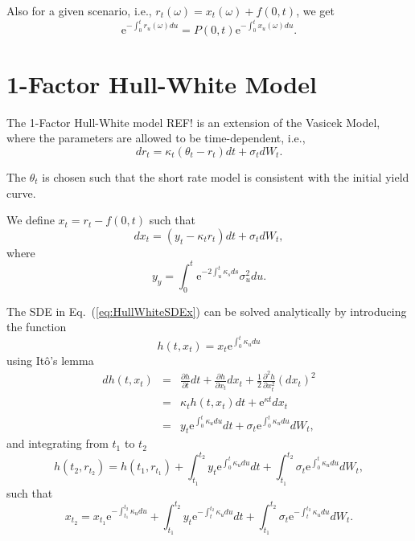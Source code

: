\documentclass{report}
\newcommand{\e}{\text{e}}
\begin{document}
Also for a given scenario, i.e., $r_t(\omega) = x_t (\omega) + f(0,t)$, we get
\begin{equation}
\e^{- \int_0^t r_u (\omega) du} = P(0,t) \e^{- \int_0^t x_u (\omega) du}.
\end{equation}


\section{1-Factor Hull-White Model}
The 1-Factor Hull-White model REF! is an extension of the Vasicek Model, where the parameters are allowed to be time-dependent, i.e.,
\begin{equation}
dr_t = \kappa_t \left( \theta_t - r_t \right) dt + \sigma_t dW_t.
\end{equation}

The $\theta_t$ is chosen such that the short rate model is consistent with the initial yield curve.

We define $x_t = r_t - f(0,t)$ such that
\begin{equation}
dx_t = \left( y_t - \kappa_t r_t \right) dt + \sigma_t dW_t,
\label{eq:HullWhiteSDEx}
\end{equation}
where
\begin{equation}
y_y = \int_0^t \e^{-2\int_u^t \kappa_s ds} \sigma_u^2 du.
\end{equation}

The SDE in Eq.~(\ref{eq:HullWhiteSDEx}) can be solved analytically by introducing the function
\begin{equation}
h(t, x_t) = x_t \e^{\int_0^t \kappa_u du}
\end{equation}
using It\^{o}'s lemma
\begin{eqnarray}
dh(t, x_t) &=& \frac{\partial h}{\partial t} dt + \frac{\partial h}{\partial x_t} dx_t + \frac{1}{2}\frac{\partial^2 h}{\partial x_t^2} \left(dx_t\right)^2 \\
&=& \kappa_t h(t, x_t) dt + \e^{\kappa t} dx_t \\
&=& y_t \e^{\int_0^t \kappa_u du} dt + \sigma_t \e^{\int_0^t \kappa_u du} dW_t,
\end{eqnarray}
and integrating from $t_1$ to $t_2$
\begin{equation}
h(t_2, r_{t_2}) = h(t_1, r_{t_1}) + \int_{t_1}^{t_2} y_t \e^{\int_0^t \kappa_u du} dt + \int_{t_1}^{t_2} \sigma_t \e^{\int_0^t \kappa_u du} dW_t,
\end{equation}
such that
\begin{equation}
x_{t_2} = x_{t_1} \e^{-\int_{t_1}^{t_2} \kappa_u du}  + \int_{t_1}^{t_2} y_t \e^{-\int_t^{t_2} \kappa_u du} dt + \int_{t_1}^{t_2} \sigma_t \e^{-\int_t^{t_2} \kappa_u du} dW_t.
\end{equation}
\end{document}
